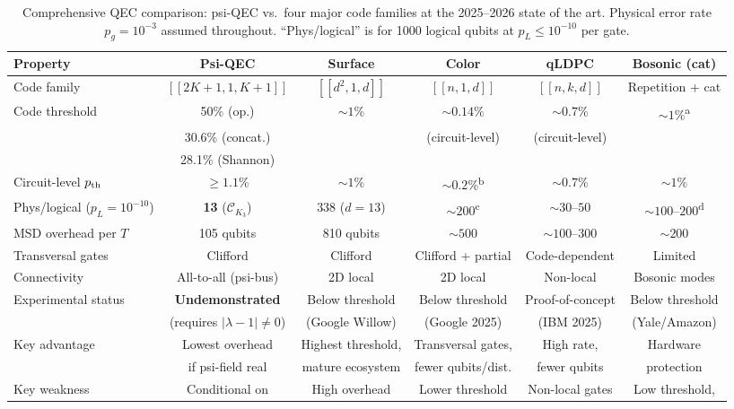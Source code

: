 \documentclass[11pt]{article}
\theoremstyle{definition}
\theoremstyle{remark}
\newcommand{\CK}{\mathcal{C}_K}
\newcommand{\lamdiff}{|\lambda-1|}
\begin{document}
\begin{table}[ht]
\centering
\caption{Comprehensive QEC comparison: psi-QEC vs.\ four major code
  families at the 2025--2026 state of the art.  Physical error rate
  $p_g = 10^{-3}$ assumed throughout.  ``Phys/logical'' is for 1000
  logical qubits at $p_L \leq 10^{-10}$ per gate.}
\label{tab:five-code}
\small
\begin{tabular}{@{}p{2.6cm}ccccc@{}}
\toprule
Property & \textbf{Psi-QEC} & Surface & Color & qLDPC & Bosonic (cat) \\
\midrule
Code family & $[[2K{+}1,1,K{+}1]]$ & $[[d^2,1,d]]$ & $[[n,1,d]]$
  & $[[n,k,d]]$ & Repetition + cat \\
\midrule
Code threshold & 50\% (op.) & $\sim 1\%$ & $\sim 0.14\%$
  & $\sim 0.7\%$ & $\sim 1\%$\textsuperscript{a} \\
 & 30.6\% (concat.) & & (circuit-level) & (circuit-level) & \\
 & 28.1\% (Shannon) & & & & \\
\midrule
Circuit-level $p_{\rm th}$ & $\geq 1.1\%$ & $\sim 1\%$
  & $\sim 0.2\%$\textsuperscript{b} & $\sim 0.7\%$ & $\sim 1\%$ \\
\midrule
Phys/logical ($p_L = 10^{-10}$) & \textbf{13} ($\CK_3$)
  & 338 ($d{=}13$) & $\sim 200$\textsuperscript{c}
  & $\sim 30$--$50$ & $\sim 100$--$200$\textsuperscript{d} \\
\midrule
MSD overhead per $T$ & 105 qubits & 810 qubits & $\sim 500$
  & $\sim 100$--$300$ & $\sim 200$ \\
\midrule
Transversal gates & Clifford & Clifford & Clifford + partial &
  Code-dependent & Limited \\
\midrule
Connectivity & All-to-all (psi-bus) & 2D local & 2D local
  & Non-local & Bosonic modes \\
\midrule
Experimental status & \textbf{Undemonstrated} & Below threshold
  & Below threshold & Proof-of-concept & Below threshold \\
 & (requires $\lamdiff \neq 0$) & (Google Willow) & (Google 2025)
  & (IBM 2025) & (Yale/Amazon) \\
\midrule
Key advantage & Lowest overhead & Highest threshold,
  & Transversal gates, & High rate, & Hardware \\
 & if psi-field real & mature ecosystem & fewer qubits/dist.
  & fewer qubits & protection \\
\midrule
Key weakness & Conditional on & High overhead & Lower threshold
  & Non-local gates & Low threshold, \\

\end{tabular}
\end{table}
\end{document}
